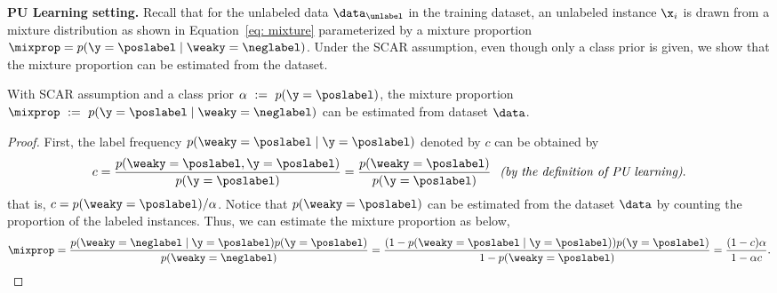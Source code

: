 \documentclass{article}
\begin{document}
\textbf{PU Learning setting.}
Recall that for the unlabeled data $\data_{\unlabel}$ in the training dataset,
an unlabeled instance $\x_i$ is drawn from a mixture distribution as shown in Equation~\ref{eq: mixture} parameterized by a mixture proportion $\mixprop = p(\y = \poslabel \mid \weaky = \neglabel)$.
Under the SCAR assumption, even though only a class prior is given, we show that the mixture proportion can be estimated from the dataset.
\begin{proposition}
\label{prop: mixture proportion}
With SCAR assumption and a class prior $\alpha~:=~p(\y = \poslabel)$, the mixture proportion $\mixprop~:=~p(\y = \poslabel \mid \weaky = \neglabel)$ can be estimated from dataset $\data$.
\end{proposition}
\begin{proof}
First, the label frequency $p(\weaky = \poslabel \mid \y = \poslabel)$ denoted by $c$ can be obtained by
\begin{equation*}
    c = \frac{p(\weaky = \poslabel, \y = \poslabel)}{p(\y = \poslabel)} = \frac{p(\weaky = \poslabel)}{p(\y = \poslabel)} \textit{~~(by the definition of PU learning)}.
\end{equation*}
that is, $c = p(\weaky = \poslabel) / \alpha$. 
Notice that $p(\weaky = \poslabel)$ can be estimated from the dataset $\data$ by counting the proportion of the labeled instances.
Thus, we can estimate the mixture proportion as below,
\begin{equation*}
    \mixprop 
    = \frac{p(\weaky = \neglabel \mid \y = \poslabel)p(\y = \poslabel)}{p(\weaky = \neglabel)} 
    = \frac{(1 -  p(\weaky = \poslabel \mid \y = \poslabel))p(\y = \poslabel)}{1 - p(\weaky = \poslabel)} 
    = \frac{(1 - c)\alpha}{1 - \alpha c}.
\end{equation*}
\end{proof}
\end{document}
